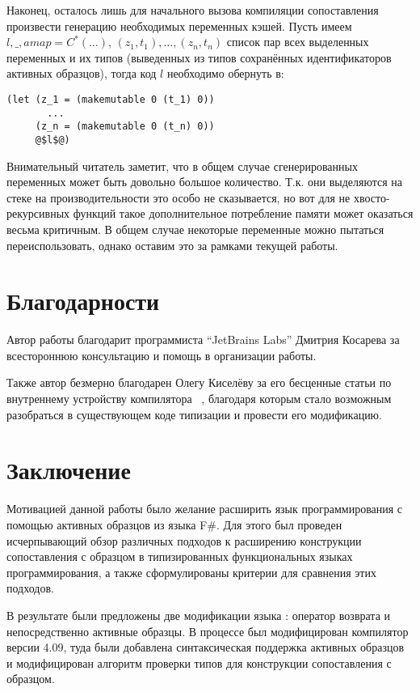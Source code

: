 Наконец, осталось лишь для начального вызова компиляции сопоставления произвести генерацию необходимых переменных кэшей. Пусть имеем $l,\_,amap=C^*(\ldots)$, $(z_1, t_1),\ldots,(z_n, t_n)$ список пар всех выделенных переменных и их типов (выведенных из типов сохранённых идентификаторов активных образцов), тогда код $l$ необходимо обернуть в:

\noindent
\begin{minipage}{\linewidth}
\begin{lstlisting}[language=lambda,escapechar=@] 
(let (z_1 = (makemutable 0 (t_1) 0))
       ...
     (z_n = (makemutable 0 (t_n) 0))
     @$l$@)
\end{lstlisting}
\end{minipage}

Внимательный читатель заметит, что в общем случае сгенерированных переменных может быть довольно большое количество. Т.к. они выделяются на стеке на производительности это особо не сказывается, но вот для не хвосто-рекурсивных функций такое дополнительное потребление памяти может оказаться весьма критичным. В общем случае некоторые переменные можно пытаться переиспользовать, однако оставим это за рамками текущей работы.

\section{Благодарности}

Автор работы благодарит программиста ``JetBrains Labs'' Дмитрия \mbox{Косарева} за всестороннюю консультацию и помощь в организации работы.

Также автор безмерно благодарен Олегу Киселёву за его бесценные статьи по внутреннему устройству компилятора \ocaml~\cite{okmij_typechecker}, благодаря которым стало возможным разобраться в существующем коде типизации и провести его модификацию.


\section{Заключение}

Мотивацией данной работы было желание расширить язык программирования \ocaml{} с помощью активных образцов из языка F\#. Для этого был проведен исчерпывающий обзор различных подходов к расширению конструкции сопоставления с образцом в типизированных функциональных языках программирования, а также сформулированы критерии для сравнения этих подходов. 

В результате были предложены две модификации языка \ocaml: оператор возврата и непосредственно активные образцы. В процессе был модифицирован компилятор \ocaml{} версии 4.09, туда были добавлена синтаксическая поддержка активных образцов и модифицирован алгоритм проверки типов для конструкции сопоставления с образцом.

